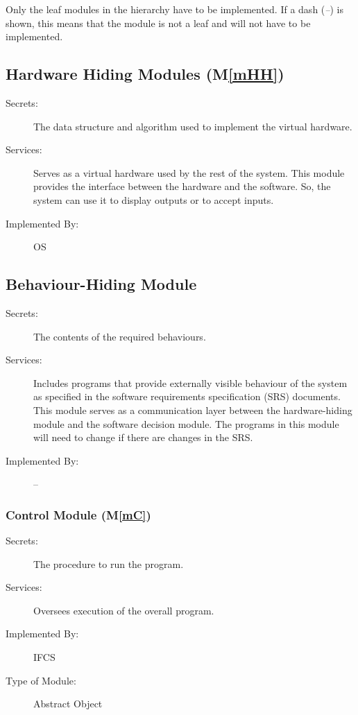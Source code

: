 \documentclass[12pt, titlepage]{article}
\newcommand{\mref}[1]{M\ref{#1}}
\begin{document}
Only the leaf modules in the hierarchy have to be implemented. If a dash
(\emph{--}) is shown, this means that the module is not a leaf and will not have
to be implemented.

\subsection{Hardware Hiding Modules (\mref{mHH})}

\begin{description}
\item[Secrets:]The data structure and algorithm used to implement the virtual
  hardware.
\item[Services:]Serves as a virtual hardware used by the rest of the
  system. This module provides the interface between the hardware and the
  software. So, the system can use it to display outputs or to accept inputs.
\item[Implemented By:] OS
\end{description}

\subsection{Behaviour-Hiding Module}

\begin{description}
\item[Secrets:]The contents of the required behaviours.
\item[Services:]Includes programs that provide externally visible behaviour of
  the system as specified in the software requirements specification (SRS)
  documents. This module serves as a communication layer between the
  hardware-hiding module and the software decision module. The programs in this
  module will need to change if there are changes in the SRS.
\item[Implemented By:] --
\end{description}

\subsubsection{Control Module (\mref{mC})}

\begin{description}
\item[Secrets:]The procedure to run the program.
\item[Services:]Oversees execution of the overall program.
\item[Implemented By:] IFCS
\item[Type of Module:] Abstract Object
\end{description}
\end{document}

